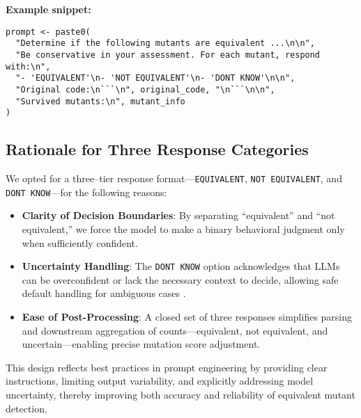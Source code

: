 \medskip
\noindent\textbf{Example snippet:}
\begin{verbatim}
prompt <- paste0(
  "Determine if the following mutants are equivalent ...\n\n",
  "Be conservative in your assessment. For each mutant, respond with:\n",
  "- 'EQUIVALENT'\n- 'NOT EQUIVALENT'\n- 'DONT KNOW'\n\n",
  "Original code:\n```\n", original_code, "\n```\n\n",
  "Survived mutants:\n", mutant_info
)
\end{verbatim}

\subsection{Rationale for Three Response Categories}

We opted for a three–tier response format—\texttt{EQUIVALENT}, \texttt{NOT EQUIVALENT}, and \texttt{DONT KNOW}—for the following reasons:

\begin{itemize}
  \item \textbf{Clarity of Decision Boundaries}: By separating “equivalent” and “not equivalent,” we force the model to make a binary behavioral judgment only when sufficiently confident.
  \item \textbf{Uncertainty Handling}: The \texttt{DONT KNOW} option acknowledges that LLMs can be overconfident or lack the necessary context to decide, allowing safe default handling for ambiguous cases \cite{liu2021pre}.
  \item \textbf{Ease of Post-Processing}: A closed set of three responses simplifies parsing and downstream aggregation of counts—equivalent, not equivalent, and uncertain—enabling precise mutation score adjustment.
\end{itemize}

This design reflects best practices in prompt engineering by providing clear instructions, limiting output variability, and explicitly addressing model uncertainty, thereby improving both accuracy and reliability of equivalent mutant detection.